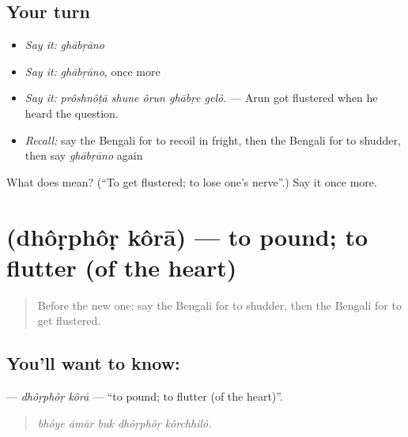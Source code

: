 \subsection*{Your turn}
\begin{itemize}
\raggedright
  \item \emph{Say it:} \emph{ghābṛāno}
  \item \emph{Say it:} \emph{ghābṛāno}, once more
  \item \emph{Say it:} \emph{prôshnôṭā shune ôrun ghābṛe gelô.} — Arun got flustered when he heard the question.
  \item \emph{Recall:} say the Bengali for to recoil in fright, then the Bengali for to shudder, then say \emph{ghābṛāno} again
\end{itemize}

\begin{tcolorbox}[breakable,colback=teal!4,colframe=teal!35!black,title={Before you move on}]
What does  mean? (\textquotedblleft{}To get flustered; to lose one's nerve\textquotedblright{}.) Say it once more.
\end{tcolorbox}
\section[\texorpdfstring{\bn{ধড়ফড়} \bn{করা} (dhôṛphôṛ kôrā)}{ধড়ফড় করা (dhôṛphôṛ kôrā)}]{  (dhôṛphôṛ kôrā) — to pound; to flutter (of the heart)}

\label{lesson:BN-C441-dhorphor-kora}



\begin{quote}
Before the new one: say the Bengali for to shudder, then the Bengali for to get flustered.
\end{quote}

\subsection*{You'll want to know:  }
\textbf{ } — \emph{dhôṛphôṛ kôrā} — \textquotedblleft{}to pound; to flutter (of the heart)\textquotedblright{}.

\begin{quote}
    
\end{quote}

\begin{quote}
\emph{bhôye āmār buk dhôṛphôṛ kôrchhilô.}
\end{quote}


